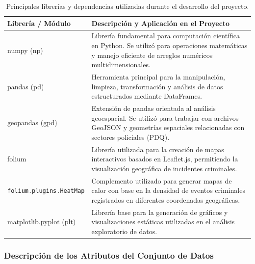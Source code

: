 \documentclass[12pt]{article}
\begin{document}
\begin{table}[H]
\renewcommand{\arraystretch}{1.4}
\centering

\begin{tabularx}{\textwidth}{|>{\ttfamily\small}p{4.5cm}|>{\raggedright\arraybackslash}X|}
\hline
\rowcolor[HTML]{EFEFEF}
\textbf{Librería / Módulo} & \textbf{Descripción y Aplicación en el Proyecto} \\ \hline

numpy (np) &
Librería fundamental para computación científica en Python. Se utilizó para operaciones matemáticas y manejo eficiente de arreglos numéricos multidimensionales. \\ \hline

pandas (pd) &
Herramienta principal para la manipulación, limpieza, transformación y análisis de datos estructurados mediante DataFrames. \\ \hline

geopandas (gpd) &
Extensión de pandas orientada al análisis geoespacial. Se utilizó para trabajar con archivos GeoJSON y geometrías espaciales relacionadas con sectores policiales (PDQ). \\ \hline

folium &
Librería utilizada para la creación de mapas interactivos basados en Leaflet.js, permitiendo la visualización geográfica de incidentes criminales. \\ \hline

\texttt{folium.plugins.HeatMap} &
Complemento utilizado para generar mapas de calor con base en la densidad de eventos criminales registrados en diferentes coordenadas geográficas. \\ \hline

matplotlib.pyplot (plt) &
Librería base para la generación de gráficos y visualizaciones estáticas utilizadas en el análisis exploratorio de datos. \\ \hline

\end{tabularx}

\caption{Principales librerías y dependencias utilizadas durante el desarrollo del proyecto.}
\label{tab:librerias}
\end{table}


\subsubsection{Descripción de los Atributos del Conjunto de Datos}
\end{document}
